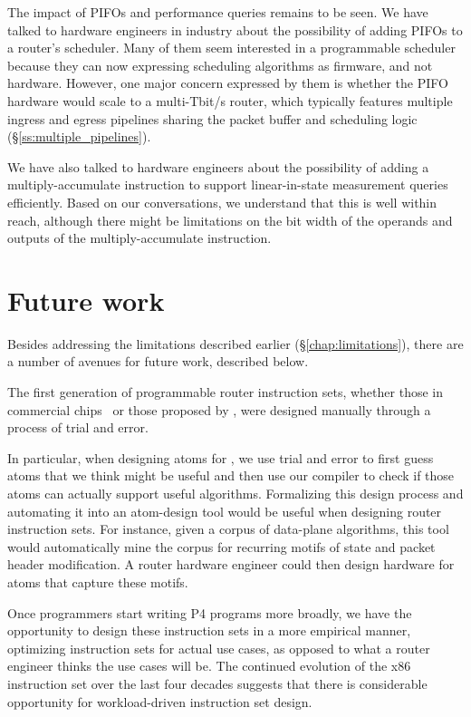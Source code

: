 The impact of PIFOs and performance queries remains to be seen. We have talked
to hardware engineers in industry about the possibility of adding PIFOs to a
router's scheduler. Many of them seem interested in a programmable scheduler
because they can now expressing scheduling algorithms as firmware, and not
hardware. However, one major concern expressed by them is whether the PIFO
hardware would scale to a multi-Tbit/s router, which typically features
multiple ingress and egress pipelines sharing the packet buffer and scheduling
logic (\S\ref{ss:multiple_pipelines}).

We have also talked to hardware engineers about the possibility of adding a
multiply-accumulate instruction to support linear-in-state measurement queries
efficiently. Based on our conversations, we understand that this is well within
reach, although there might be limitations on the bit width of the operands and
outputs of the multiply-accumulate instruction.

\section{Future work}
\label{s:future}

Besides addressing the limitations described earlier
(\S\ref{chap:limitations}), there are a number of avenues for future work,
described below.

 The first generation of programmable
router instruction sets, whether those in commercial chips~\cite{xpliant,
flexpipe, tofino, rmt} or those proposed by \pktlanguage, were designed
manually through a process of trial and error.

In particular, when designing atoms for \pktlanguage, we use trial and error to
first guess atoms that we think might be useful and then use our compiler to
check if those atoms can actually support useful algorithms.  Formalizing this
design process and automating it into an atom-design tool would be useful when
designing router instruction sets. For instance, given a corpus of data-plane
algorithms, this tool would automatically mine the corpus for recurring motifs
of state and packet header modification. A router hardware engineer could then
design hardware for atoms that capture these motifs.

 Once programmers start writing P4 programs more broadly, we have the
opportunity to design these instruction sets in a more empirical manner,
optimizing instruction sets for actual use cases, as opposed to what a router
engineer thinks the use cases will be. The continued evolution of the x86
instruction set over the last four decades suggests that there is considerable
opportunity for workload-driven instruction set design.

